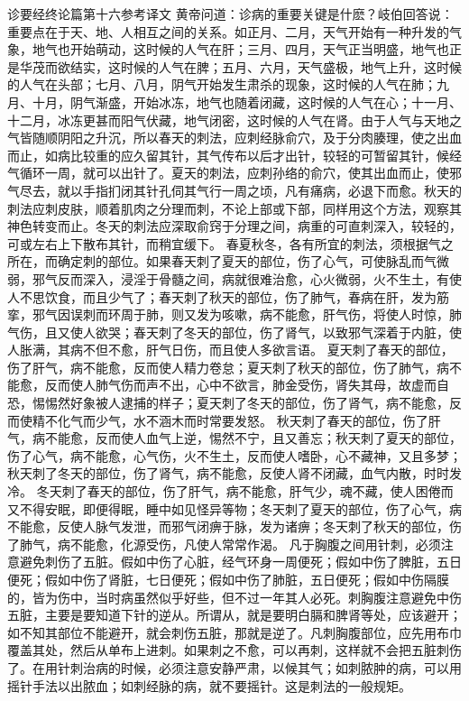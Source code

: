 \documentclass[a4paper,12pt,UTF8,twoside]{ctexbook}
\begin{document}
诊要经终论篇第十六参考译文
黄帝问道：诊病的重要关键是什麽？岐伯回答说：重要点在于天、地、人相互之间的关系。如正月、二月，天气开始有一种升发的气象，地气也开始萌动，这时候的人气在肝；三月、四月，天气正当明盛，地气也正是华茂而欲结实，这时候的人气在脾；五月、六月，天气盛极，地气上升，这时候的人气在头部；七月、八月，阴气开始发生肃杀的现象，这时候的人气在肺；九月、十月，阴气渐盛，开始冰冻，地气也随着闭藏，这时候的人气在心；十一月、十二月，冰冻更甚而阳气伏藏，地气闭密，这时候的人气在肾。由于人气与天地之气皆随顺阴阳之升沉，所以春天的刺法，应刺经脉俞穴，及于分肉腠理，使之出血而止，如病比较重的应久留其针，其气传布以后才出针，较轻的可暂留其针，候经气循环一周，就可以出针了。夏天的刺法，应刺孙络的俞穴，使其出血而止，使邪气尽去，就以手指扪闭其针孔伺其气行一周之顷，凡有痛病，必退下而愈。秋天的刺法应刺皮肤，顺着肌肉之分理而刺，不论上部或下部，同样用这个方法，观察其神色转变而止。冬天的刺法应深取俞窍于分理之间，病重的可直刺深入，较轻的，可或左右上下散布其针，而稍宜缓下。
春夏秋冬，各有所宜的刺法，须根据气之所在，而确定刺的部位。如果春天刺了夏天的部位，伤了心气，可使脉乱而气微弱，邪气反而深入，浸淫于骨髓之间，病就很难治愈，心火微弱，火不生土，有使人不思饮食，而且少气了；春天刺了秋天的部位，伤了肺气，春病在肝，发为筋挛，邪气因误刺而环周于肺，则又发为咳嗽，病不能愈，肝气伤，将使人时惊，肺气伤，且又使人欲哭；春天刺了冬天的部位，伤了肾气，以致邪气深着于内脏，使人胀满，其病不但不愈，肝气日伤，而且使人多欲言语。
夏天刺了春天的部位，伤了肝气，病不能愈，反而使人精力卷怠；夏天刺了秋天的部位，伤了肺气，病不能愈，反而使人肺气伤而声不出，心中不欲言，肺金受伤，肾失其母，故虚而自恐，惕惕然好象被人逮捕的样子；夏天刺了冬天的部位，伤了肾气，病不能愈，反而使精不化气而少气，水不涵木而时常要发怒。
秋天刺了春天的部位，伤了肝气，病不能愈，反而使人血气上逆，惕然不宁，且又善忘；秋天刺了夏天的部位，伤了心气，病不能愈，心气伤，火不生土，反而使人嗜卧，心不藏神，又且多梦；秋天刺了冬天的部位，伤了肾气，病不能愈，反使人肾不闭藏，血气内散，时时发冷。
冬天刺了春天的部位，伤了肝气，病不能愈，肝气少，魂不藏，使人困倦而又不得安眠，即便得眠，睡中如见怪异等物；冬天刺了夏天的部位，伤了心气，病不能愈，反使人脉气发泄，而邪气闭痹于脉，发为诸痹；冬天刺了秋天的部位，伤了肺气，病不能愈，化源受伤，凡使人常常作渴。
凡于胸腹之间用针刺，必须注意避免刺伤了五脏。假如中伤了心脏，经气环身一周便死；假如中伤了脾脏，五日便死；假如中伤了肾脏，七日便死；假如中伤了肺脏，五日便死；假如中伤隔膜的，皆为伤中，当时病虽然似乎好些，但不过一年其人必死。刺胸腹注意避免中伤五脏，主要是要知道下针的逆从。所谓从，就是要明白膈和脾肾等处，应该避开；如不知其部位不能避开，就会刺伤五脏，那就是逆了。凡刺胸腹部位，应先用布巾覆盖其处，然后从单布上进刺。如果刺之不愈，可以再刺，这样就不会把五脏刺伤了。在用针刺治病的时候，必须注意安静严肃，以候其气；如刺脓肿的病，可以用摇针手法以出脓血；如刺经脉的病，就不要摇针。这是刺法的一般规矩。
\end{document}
